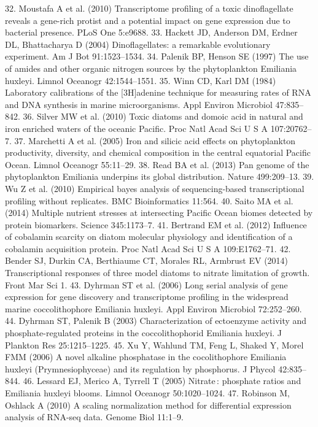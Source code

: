 32. 	Moustafa A et al. (2010) Transcriptome profiling of a toxic dinoflagellate reveals a gene-rich protist and a potential impact on gene expression due to bacterial presence. PLoS One 5:e9688.
33. 	Hackett JD, Anderson DM, Erdner DL, Bhattacharya D (2004) Dinoflagellates: a remarkable evolutionary experiment. Am J Bot 91:1523–1534.
34. 	Palenik BP, Henson SE (1997) The use of amides and other organic nitrogen sources by the phytoplankton Emiliania huxleyi. Limnol Oceanogr 42:1544–1551.
35. 	Winn CD, Karl DM (1984) Laboratory calibrations of the [3H]adenine technique for measuring rates of RNA and DNA synthesis in marine microorganisms. Appl Environ Microbiol 47:835–842.
36. 	Silver MW et al. (2010) Toxic diatoms and domoic acid in natural and iron enriched waters of the oceanic Pacific. Proc Natl Acad Sci U S A 107:20762–7.
37. 	Marchetti A et al. (2005) Iron and silicic acid effects on phytoplankton productivity, diversity, and chemical composition in the central equatorial Pacific Ocean. Limnol Oceanogr 55:11–29.
38. 	Read BA et al. (2013) Pan genome of the phytoplankton Emiliania underpins its global distribution. Nature 499:209–13.
39. 	Wu Z et al. (2010) Empirical bayes analysis of sequencing-based transcriptional profiling without replicates. BMC Bioinformatics 11:564.
40. 	Saito MA et al. (2014) Multiple nutrient stresses at intersecting Pacific Ocean biomes detected by protein biomarkers. Science 345:1173–7.
41. 	Bertrand EM et al. (2012) Influence of cobalamin scarcity on diatom molecular physiology and identification of a cobalamin acquisition protein. Proc Natl Acad Sci U S A 109:E1762–71.
42. 	Bender SJ, Durkin CA, Berthiaume CT, Morales RL, Armbrust EV (2014) Transcriptional responses of three model diatoms to nitrate limitation of growth. Front Mar Sci 1.
43. 	Dyhrman ST et al. (2006) Long serial analysis of gene expression for gene discovery and transcriptome profiling in the widespread marine coccolithophore Emiliania huxleyi. Appl Environ Microbiol 72:252–260.
44. 	Dyhrman ST, Palenik B (2003) Characterization of ectoenzyme activity and phosphate-regulated proteins in the coccolithophorid Emiliania huxleyi. J Plankton Res 25:1215–1225.
45. 	Xu Y, Wahlund TM, Feng L, Shaked Y, Morel FMM (2006) A novel alkaline phosphatase in the cocolithophore Emiliania huxleyi (Prymnesiophyceae) and its regulation by phosphorus. J Phycol 42:835–844.
46. 	Lessard EJ, Merico A, Tyrrell T (2005) Nitrate : phosphate ratios and Emiliania huxleyi blooms. Limnol Oceanogr 50:1020–1024.
47. 	Robinson M, Oshlack A (2010) A scaling normalization method for differential expression analysis of RNA-seq data. Genome Biol 11:1–9.
